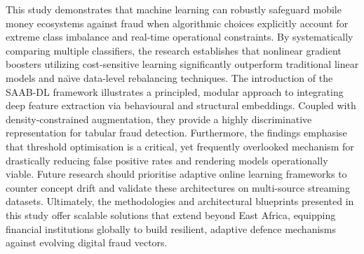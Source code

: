 \documentclass[a4paper,fleqn]{cas-sc}
\begin{document}
This study demonstrates that machine learning can robustly safeguard mobile money ecosystems against fraud when algorithmic choices explicitly account for extreme class imbalance and real-time operational constraints. By systematically comparing multiple classifiers, the research establishes that nonlinear gradient boosters utilizing cost-sensitive learning significantly outperform traditional linear models and na\"{\i}ve data-level rebalancing techniques. The introduction of the SAAB-DL framework illustrates a principled, modular approach to integrating deep feature extraction via behavioural and structural embeddings. Coupled with density-constrained augmentation,  they provide a highly discriminative representation for tabular fraud detection. Furthermore, the findings emphasise that threshold optimisation is a critical, yet frequently overlooked mechanism for drastically reducing false positive rates and rendering models operationally viable. Future research should prioritise adaptive online learning frameworks to counter concept drift and validate these architectures on multi-source streaming datasets. Ultimately, the methodologies and architectural blueprints presented in this study offer scalable solutions that extend beyond East Africa, equipping financial institutions globally to build resilient, adaptive defence mechanisms against evolving digital fraud vectors.





\printcredits

% 
% 


\end{document}
